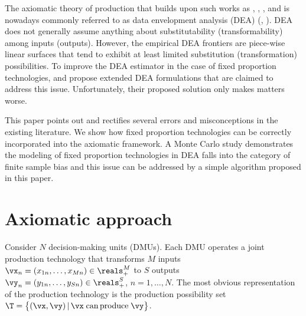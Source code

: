 {The axiomatic theory of production that builds upon such works as \textcite{Koopmans1951}, \textcite{Farrell1957}, \textcite{Shephard1970}, and \textcite{Afriat1972} is
nowadays commonly referred to as data envelopment analysis (DEA) (\citeauthor{Charnes1978}, \citeyear{Charnes1978}). DEA does not generally assume anything about substitutability (transformability) among inputs (outputs). However, the empirical DEA frontiers are piece-wise linear surfaces that tend to exhibit at least limited substitution (transformation) possibilities. To improve the DEA estimator in the case of fixed proportion technologies, \textcite{Barnum2011} and \textcite{Barnum2017} propose extended DEA formulations that are claimed to address this issue. Unfortunately, their proposed solution only makes matters worse.

This paper points out and rectifies several errors and misconceptions in the existing literature. We show how fixed proportion technologies can be correctly incorporated into the axiomatic framework. A Monte Carlo study demonstrates the modeling of fixed proportion technologies in DEA falls into the category of finite sample bias and this issue can be addressed by a simple algorithm proposed in this paper.

\section{Axiomatic approach}\label{sec:setup}
Consider $N$ decision-making units (DMUs). Each DMU operates a joint production technology that transforms $M$ inputs $\vx_n = (x_{1n}, \ldots, x_{Mn}) \in \reals_+^M$ to $S$ outputs $\vy_n = (y_{1n}, \ldots, y_{Sn}) \in \reals_+^S$, $n = 1, \ldots, N$. The most obvious representation of the production technology is the production possibility set $\T = \bigl\{(\vx,\vy)\,|\,\vx\;{\rm{can}}\,{\rm{produce}}\;\vy\bigl\}$.

}
